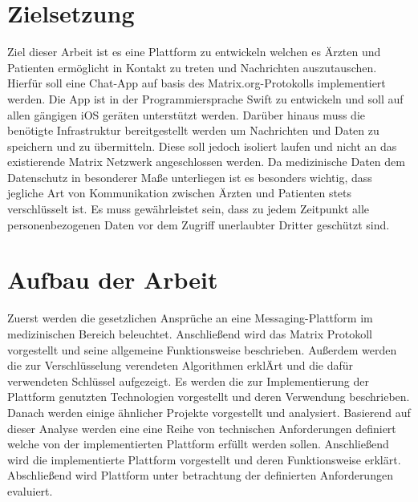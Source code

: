     \newpage
    \section{Zielsetzung}\label{sec:zielsetzung}
    Ziel dieser Arbeit ist es eine Plattform zu entwickeln welchen es Ärzten und Patienten ermöglicht in Kontakt zu treten und Nachrichten auszutauschen.
    Hierfür soll eine Chat-App auf basis des Matrix.org-Protokolls implementiert werden.
    Die App ist in der Programmiersprache Swift zu entwickeln und soll auf allen gängigen iOS geräten unterstützt werden.
    Darüber hinaus muss die benötigte Infrastruktur bereitgestellt werden um Nachrichten und Daten zu speichern und zu übermitteln.
    Diese soll jedoch isoliert laufen und nicht an das existierende Matrix Netzwerk angeschlossen werden.
    Da medizinische Daten dem Datenschutz in besonderer Maße unterliegen ist es besonders wichtig,
    dass jegliche Art von Kommunikation zwischen Ärzten und Patienten stets verschlüsselt ist.
    Es muss gewährleistet sein, dass zu jedem Zeitpunkt alle personenbezogenen Daten vor dem Zugriff unerlaubter Dritter geschützt sind.

    \section{Aufbau der Arbeit}\label{sec:aufbau-der-arbeit}
    Zuerst werden die gesetzlichen Ansprüche an eine Messaging-Plattform im medizinischen Bereich beleuchtet.
    Anschließend wird das Matrix Protokoll vorgestellt und seine allgemeine Funktionsweise beschrieben.
    Außerdem werden die zur Verschlüsselung verendeten Algorithmen erklÄrt und die dafür verwendeten Schlüssel aufgezeigt.
    Es werden die zur Implementierung der Plattform genutzten Technologien vorgestellt und deren Verwendung beschrieben.
    Danach werden einige ähnlicher Projekte vorgestellt und analysiert.
    Basierend auf dieser Analyse werden eine eine Reihe von technischen Anforderungen definiert welche von der implementierten Plattform erfüllt werden sollen.
    Anschließend wird die implementierte Plattform vorgestellt und deren Funktionsweise erklärt.
    Abschließend wird Plattform unter betrachtung der definierten Anforderungen evaluiert.

